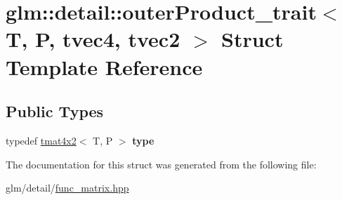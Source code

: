 \hypertarget{structglm_1_1detail_1_1outerProduct__trait_3_01T_00_01P_00_01tvec4_00_01tvec2_01_4}{\section{glm\-:\-:detail\-:\-:outer\-Product\-\_\-trait$<$ T, P, tvec4, tvec2 $>$ Struct Template Reference}
\label{structglm_1_1detail_1_1outerProduct__trait_3_01T_00_01P_00_01tvec4_00_01tvec2_01_4}
}
\subsection*{Public Types}
\begin{DoxyCompactItemize}
\item 
\hypertarget{structglm_1_1detail_1_1outerProduct__trait_3_01T_00_01P_00_01tvec4_00_01tvec2_01_4_a15cc3a28bd3e09c75a19ce0349c76d9a}{typedef \hyperlink{structglm_1_1tmat4x2}{tmat4x2}$<$ T, P $>$ {\bfseries type}}\label{structglm_1_1detail_1_1outerProduct__trait_3_01T_00_01P_00_01tvec4_00_01tvec2_01_4_a15cc3a28bd3e09c75a19ce0349c76d9a}

\end{DoxyCompactItemize}


The documentation for this struct was generated from the following file\-:\begin{DoxyCompactItemize}
\item 
glm/detail/\hyperlink{func__matrix_8hpp}{func\-\_\-matrix.\-hpp}\end{DoxyCompactItemize}
